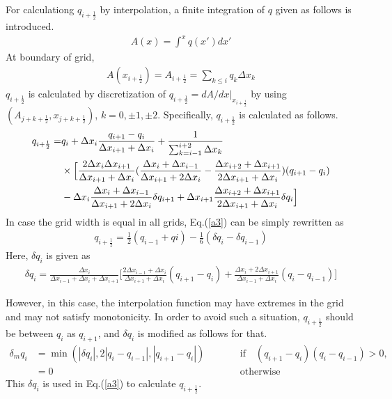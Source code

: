 For calculationg \(q_{i+\frac{1}{2}}\) by interpolation, a finite integration of \(q\) given as follows is introduced. \begin{eqnarray}A(x)= \int^{x} q(x') dx'\end{eqnarray} At boundary of grid,
\begin{eqnarray}A(x_{i+\frac{1}{2}})=A_{i+\frac{1}{2}}=\sum_{k\leq i}q_{k}\Delta x_{k}\end{eqnarray} \(q_{i+\frac{1}{2}}\) is calculated by discretization of \(q_{i+\frac{1}{2}}=dA/dx |_{x_{i+\frac{1}{2}}}\) by using
\((A_{j+k+\frac{1}{2}},x_{j+k+\frac{1}{2}})\), \(k=0,\pm 1, \pm 2\). Specifically, \(q_{i+\frac{1}{2}}\) is calculated as follows. \begin{eqnarray}\label{a3}
  \begin{split}
    q_{i+\frac{1}{2}}=&q_{i}+\Delta x_{i} \frac{q_{i+1}-q_{i}}{\Delta x_{i+1}+\Delta x_{i}}+\frac{1}{\sum_{k=i-1}^{i+2}\Delta x_{k}}\\
    &\times \Bigl[\frac{2\Delta x_{i}\Delta x_{i+1}}{\Delta x_{i+1}+\Delta x_{i}}(\frac{\Delta x_{i}+\Delta x_{i-1}}{\Delta x_{i+1}+2\Delta x_{i}}-\frac{\Delta x_{i+2}+\Delta x_{i+1}}{2\Delta x_{i+1}+\Delta x_{i}})(q_{i+1}-q_{i})\\
     & -\Delta x_{i}\frac{\Delta x_{i}+\Delta x_{i-1}}{\Delta x_{i+1}+2\Delta x_{i}} \delta q_{i+1}+\Delta x_{i+1} \frac{\Delta x_{i+2}+\Delta x_{i+1}}{2\Delta x_{i+1}+\Delta x_{i}} \delta q_{i}\Bigr]
  \end{split}\end{eqnarray} In case the grid width is equal in all grids, Eq.(\ref{a3}) can be simply rewritten as
\begin{eqnarray}q_{i+\frac{1}{2}}=\frac{1}{2}(q_{i-1}+q{i})-\frac{1}{6}(\delta q_{i}-\delta q_{i-1})\end{eqnarray} Here, \(\delta q_{i}\) is given as
\begin{eqnarray}\delta q_{i}=\frac{\Delta x_{i}}{\Delta x_{i-1}+\Delta x_{i}+\Delta x_{i+1}}\biggl[\frac{2\Delta x_{i-1}+\Delta x_{i}}{\Delta x_{i+1}+\Delta x_{i}}(q_{i+1}-q_{i})+\frac{\Delta x_{i}+2\Delta x_{i+1}}{\Delta x_{i-1}+\Delta x_{i}}(q_{i}-q_{i-1})\biggr]\end{eqnarray}

However, in this case, the interpolation function may have extremes in the grid and may not satisfy monotonicity. In order to avoid such a situation, \(q_{i+\frac{1}{2}}\) should be between \(q_{i}\)
as \(q_{i+1}\), and \(\delta q_{i}\) is modified as follows for that. \begin{eqnarray}
\delta_{m} q_{i} & =\min(|\delta
q_{i}|,2|q_{i}-q_{i-1}|,|q_{i+1}-q_{i}|) && \qquad \text{if$\quad(q_{i+1}-q_{i})(q_{i}-q_{i-1}) >0$}, \\
& =0 && \qquad \text{otherwise}
\end{eqnarray} This \(\delta q_{i}\) is used in Eq.(\ref{a3}) to calculate \(q_{i+\frac{1}{2}}\).

